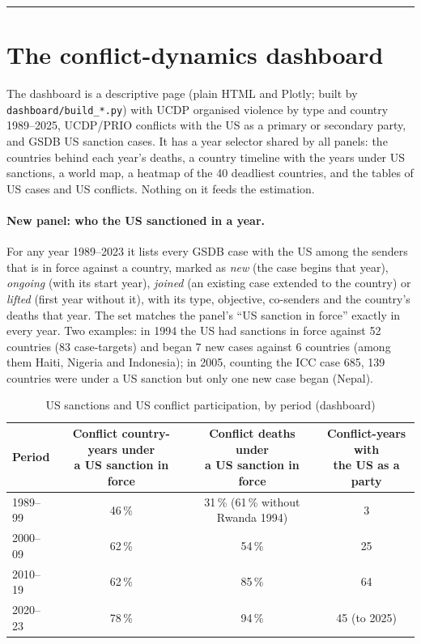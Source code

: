 \documentclass[11pt,a4paper]{article}
\newcommand{\parttitle}[1]{\vspace{1.2em}\noindent{\Large\bfseries #1}\par\vspace{0.3em}\hrule\vspace{0.6em}}
\begin{document}
\parttitle{Part A --- Data exploration}

\section{The conflict-dynamics dashboard}
\label{sec:dashboard}

The dashboard is a descriptive page (plain HTML and Plotly; built by \texttt{dashboard/build\_*.py}) with UCDP
organised violence by type and country 1989--2025, UCDP/PRIO conflicts with the US as a primary or secondary party,
and GSDB US sanction cases. It has a year selector shared by all panels: the countries behind each year's deaths, a
country timeline with the years under US sanctions, a world map, a heatmap of the 40 deadliest countries, and the
tables of US cases and US conflicts. Nothing on it feeds the estimation.

\paragraph{New panel: who the US sanctioned in a year.} For any year 1989--2023 it lists every GSDB case with the US
among the senders that is in force against a country, marked as \emph{new} (the case begins that year),
\emph{ongoing} (with its start year), \emph{joined} (an existing case extended to the country) or \emph{lifted}
(first year without it), with its type, objective, co-senders and the country's deaths that year. The set matches the
panel's ``US sanction in force'' exactly in every year. Two examples: in 1994 the US had sanctions in force against
52 countries (83 case-targets) and began 7 new cases against 6 countries (among them Haiti, Nigeria and Indonesia);
in 2005, counting the ICC case 685, 139 countries were under a US sanction but only one new case began (Nepal).

\begin{table}[H]
\centering\small
\caption{US sanctions and US conflict participation, by period (dashboard)}
\label{tab:dashboard}
\begin{tabular}{@{}lccc@{}}
\toprule
Period & \makecell{Conflict country-years under\\a US sanction in force} & \makecell{Conflict deaths under\\a US sanction in force} & \makecell{Conflict-years with\\the US as a party} \\
\midrule
1989--99 & 46\,\% & 31\,\% (61\,\% without Rwanda 1994) & 3 \\
2000--09 & 62\,\% & 54\,\% & 25 \\
2010--19 & 62\,\% & 85\,\% & 64 \\
2020--23 & 78\,\% & 94\,\% & 45 (to 2025) \\
\bottomrule
\end{tabular}
\end{table}
\end{document}
